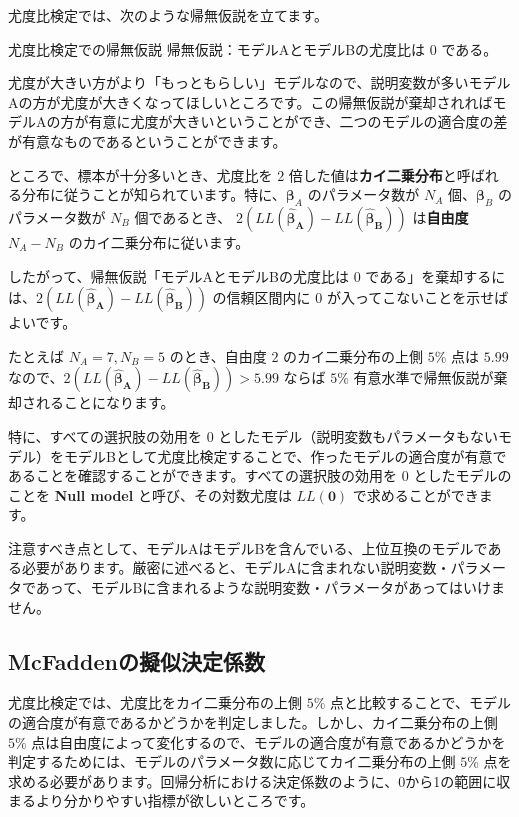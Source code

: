尤度比検定では、次のような帰無仮説を立てます。

\begin{itembox}[l]{尤度比検定での帰無仮説}
    帰無仮説：モデルAとモデルBの尤度比は $0$ である。
\end{itembox}

尤度が大きい方がより「もっともらしい」モデルなので、説明変数が多いモデルAの方が尤度が大きくなってほしいところです。この帰無仮説が棄却されればモデルAの方が有意に尤度が大きいということができ、二つのモデルの適合度の差が有意なものであるということができます。

ところで、標本が十分多いとき、尤度比を $2$ 倍した値は\textbf{カイ二乗分布}と呼ばれる分布に従うことが知られています。特に、$\bm\beta_A$ のパラメータ数が $N_A$ 個、$\bm\beta_B$ のパラメータ数が $N_B$ 個であるとき、 $2(LL(\bm{\hat\beta_A})-LL(\bm{\hat\beta_B}))$ は\textbf{自由度} $N_A-N_B$ のカイ二乗分布に従います。

したがって、帰無仮説「モデルAとモデルBの尤度比は $0$ である」を棄却するには、$2(LL(\bm{\hat\beta_A})-LL(\bm{\hat\beta_B}))$ の信頼区間内に $0$ が入ってこないことを示せばよいです。

たとえば $N_A=7, N_B=5$ のとき、自由度 $2$ のカイ二乗分布の上側 $5\%$ 点は $5.99$ なので、$2(LL(\bm{\hat\beta_A})-LL(\bm{\hat\beta_B}))>5.99$ ならば $5\%$ 有意水準で帰無仮説が棄却されることになります。

特に、すべての選択肢の効用を $0$ としたモデル（説明変数もパラメータもないモデル）をモデルBとして尤度比検定することで、作ったモデルの適合度が有意であることを確認することができます。すべての選択肢の効用を $0$ としたモデルのことを \textbf{Null model} と呼び、その対数尤度は $LL(\bm 0)$ で求めることができます。

注意すべき点として、モデルAはモデルBを含んでいる、上位互換のモデルである必要があります。厳密に述べると、モデルAに含まれない説明変数・パラメータであって、モデルBに含まれるような説明変数・パラメータがあってはいけません。

\subsection{McFaddenの擬似決定係数}

尤度比検定では、尤度比をカイ二乗分布の上側 $5\%$ 点と比較することで、モデルの適合度が有意であるかどうかを判定しました。しかし、カイ二乗分布の上側 $5\%$ 点は自由度によって変化するので、モデルの適合度が有意であるかどうかを判定するためには、モデルのパラメータ数に応じてカイ二乗分布の上側 $5\%$ 点を求める必要があります。回帰分析における決定係数のように、0から1の範囲に収まるより分かりやすい指標が欲しいところです。

